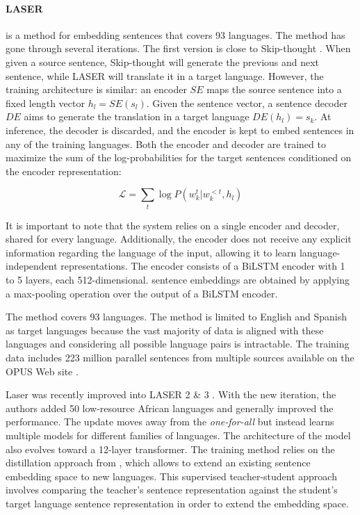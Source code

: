 \paragraph{LASER} \parencite{artetxe_19} is a method for embedding sentences that covers 93 languages. The method has gone through several iterations. The first version is close to Skip-thought \parencite{kiros_15}. When given a source sentence, Skip-thought will generate the previous and next sentence, while LASER will translate it in a target language. However, the training architecture is similar: an encoder $SE$ maps the source sentence into a fixed length vector $h_l = SE(s_l)$. Given the sentence vector, a sentence decoder $DE$ aims to generate the translation in a target language $DE(h_l) = s_{k}$.  At inference, the decoder is discarded, and the encoder is kept to embed sentences in any of the training languages. Both the encoder and decoder are trained to maximize the sum of the log-probabilities for the target sentences conditioned on the encoder representation:

\begin{equation*}
    \mathcal{L} = \sum_t \log P(w_{k}^t | w_{k}^{<t}, h_l)
\end{equation*}

It is important to note that the system relies on a single encoder and decoder, shared for every language. Additionally, the encoder does not receive any explicit information regarding the language of the input, allowing it to learn language-independent representations.  The encoder consists of a BiLSTM encoder with 1 to 5 layers, each 512-dimensional. sentence embeddings are obtained by applying a max-pooling operation over the output of a BiLSTM encoder.

The method covers 93 languages. The method is limited to English and Spanish as target languages because the vast majority of data is aligned with these languages and considering all possible language pairs is intractable. The training data includes 223 million parallel sentences from multiple sources available on the OPUS Web site \parencite{tiedemann_12}.

Laser was recently improved into LASER 2 \& 3 \parencite{heffernan_22}. With the new iteration, the authors added 50 low-resource African languages and generally improved the performance.
The update moves away from the \textit{one-for-all} but instead learns multiple models for different families of languages. The architecture of the model also evolves toward a 12-layer transformer. The training method relies on the distillation approach from \textcite{reimers_20}, which allows to extend an existing sentence embedding space to new languages. This supervised teacher-student approach involves comparing the teacher's sentence representation against the student's target language sentence representation in order to extend the embedding space.

